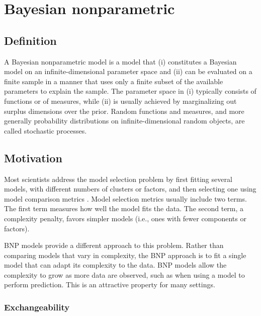 \chapter{Bayesian nonparametric}

\section{Definition} \label{BNP_def}
A Bayesian nonparametric model is a model that (i) constitutes a Bayesian model on an infinite-dimensional parameter space and (ii) can be evaluated on a finite sample in a manner that uses only a finite subset of the available parameters to explain the sample.
The parameter space in (i) typically consists of functions or of measures, while (ii) is usually achieved by marginalizing out surplus dimensions over the prior. Random functions and measures, and more generally probability distributions on infinite-dimensional random objects, are called stochastic processes.


\section{Motivation}
Most scientists address the model selection problem by first fitting several models, with different numbers of clusters or factors, and then selecting one using model comparison metrics \cite{Claeskens:1251912}. Model selection metrics usually include two terms. The first term measures how well the model fits the data. The second term, a complexity penalty, favors simpler models (i.e., ones with fewer components or factors).

\gls{BNP} models provide a different approach to this problem. Rather than comparing models that vary in complexity, the \gls{BNP} approach is to fit a single model that can adapt its complexity to the data. \gls{BNP} models allow the complexity to grow as more data are observed, such as when using a model to perform prediction. This is an attractive property for many settings.


\subsection{Exchangeability}


